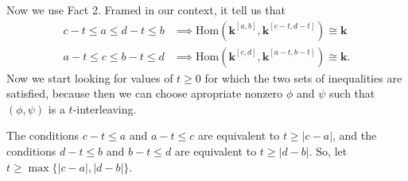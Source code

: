 \documentclass[11pt]{article}
\begin{document}
Now we use Fact 2.
Framed in our context, it tell us that 
\begin{equation}\label{eq:inequalities-for-non-trivial-hom}
\begin{aligned}
c-t\leq a \leq d-t\leq b &\implies \mathrm{Hom}(\mathbf{k}^{[a,b]}, \mathbf{k}^{[c-t,d-t]})\cong \mathbf{k} \\
a-t\leq c \leq b-t\leq d &\implies \mathrm{Hom}(\mathbf{k}^{[c,d]}, \mathbf{k}^{[a-t,b-t]})\cong \mathbf{k} .
\end{aligned} 
\end{equation}
Now we start looking for values of \(t\geq0\)
for which the two sets of inequalities
are satisfied, because then we can choose 
apropriate
nonzero \(\phi\) and \(\psi\)
such that \((\phi,\psi)\) is  a \(t\)-interleaving.

The conditions $ c-t\leq a$ and $ a-t\leq c$ are equivalent to 
$t\geq  |c-a| $, 
and the conditions 
$ d-t\leq b$ and $ b-t\leq d$ are equivalent to 
$t\geq  |d-b| $.
So, let \(t\geq\max\{|c-a|,|d-b|\}\).
\end{document}
